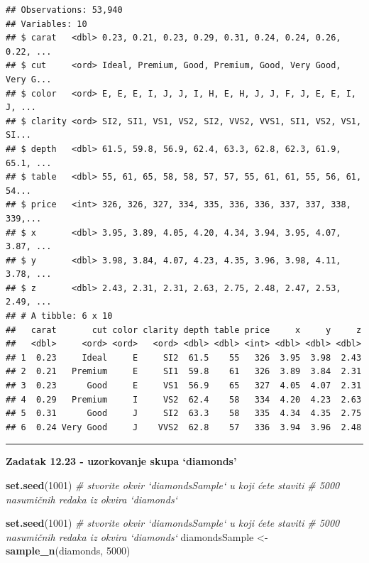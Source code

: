 \documentclass[]{book}
\newenvironment{Shaded}{\begin{snugshade}}{\end{snugshade}}
\newcommand{\KeywordTok}[1]{\textcolor[rgb]{0.13,0.29,0.53}{\textbf{#1}}}
\newcommand{\DecValTok}[1]{\textcolor[rgb]{0.00,0.00,0.81}{#1}}
\newcommand{\StringTok}[1]{\textcolor[rgb]{0.31,0.60,0.02}{#1}}
\newcommand{\CommentTok}[1]{\textcolor[rgb]{0.56,0.35,0.01}{\textit{#1}}}
\newcommand{\NormalTok}[1]{#1}
\theoremstyle{definition}
\theoremstyle{definition}
\theoremstyle{definition}
\theoremstyle{remark}
\begin{document}
\begin{verbatim}
## Observations: 53,940
## Variables: 10
## $ carat   <dbl> 0.23, 0.21, 0.23, 0.29, 0.31, 0.24, 0.24, 0.26, 0.22, ...
## $ cut     <ord> Ideal, Premium, Good, Premium, Good, Very Good, Very G...
## $ color   <ord> E, E, E, I, J, J, I, H, E, H, J, J, F, J, E, E, I, J, ...
## $ clarity <ord> SI2, SI1, VS1, VS2, SI2, VVS2, VVS1, SI1, VS2, VS1, SI...
## $ depth   <dbl> 61.5, 59.8, 56.9, 62.4, 63.3, 62.8, 62.3, 61.9, 65.1, ...
## $ table   <dbl> 55, 61, 65, 58, 58, 57, 57, 55, 61, 61, 55, 56, 61, 54...
## $ price   <int> 326, 326, 327, 334, 335, 336, 336, 337, 337, 338, 339,...
## $ x       <dbl> 3.95, 3.89, 4.05, 4.20, 4.34, 3.94, 3.95, 4.07, 3.87, ...
## $ y       <dbl> 3.98, 3.84, 4.07, 4.23, 4.35, 3.96, 3.98, 4.11, 3.78, ...
## $ z       <dbl> 2.43, 2.31, 2.31, 2.63, 2.75, 2.48, 2.47, 2.53, 2.49, ...
## # A tibble: 6 x 10
##   carat       cut color clarity depth table price     x     y     z
##   <dbl>     <ord> <ord>   <ord> <dbl> <dbl> <int> <dbl> <dbl> <dbl>
## 1  0.23     Ideal     E     SI2  61.5    55   326  3.95  3.98  2.43
## 2  0.21   Premium     E     SI1  59.8    61   326  3.89  3.84  2.31
## 3  0.23      Good     E     VS1  56.9    65   327  4.05  4.07  2.31
## 4  0.29   Premium     I     VS2  62.4    58   334  4.20  4.23  2.63
## 5  0.31      Good     J     SI2  63.3    58   335  4.34  4.35  2.75
## 6  0.24 Very Good     J    VVS2  62.8    57   336  3.94  3.96  2.48
\end{verbatim}

\begin{center}\rule{0.5\linewidth}{\linethickness}\end{center}

\textbf{Zadatak 12.23 - uzorkovanje skupa `diamonds'}

\begin{Shaded}
\begin{Highlighting}[]
\KeywordTok{set.seed}\NormalTok{(}\DecValTok{1001}\NormalTok{)}
\CommentTok{# stvorite okvir `diamondsSample` u koji ćete staviti}
\CommentTok{# 5000 nasumičnih redaka iz okvira `diamonds`}
\end{Highlighting}
\end{Shaded}

\begin{Shaded}
\begin{Highlighting}[]
\KeywordTok{set.seed}\NormalTok{(}\DecValTok{1001}\NormalTok{)}
\CommentTok{# stvorite okvir `diamondsSample` u koji ćete staviti}
\CommentTok{# 5000 nasumičnih redaka iz okvira `diamonds`}
\NormalTok{diamondsSample <-}\StringTok{ }\KeywordTok{sample_n}\NormalTok{(diamonds, }\DecValTok{5000}\NormalTok{)}
\end{Highlighting}
\end{Shaded}
\end{document}
